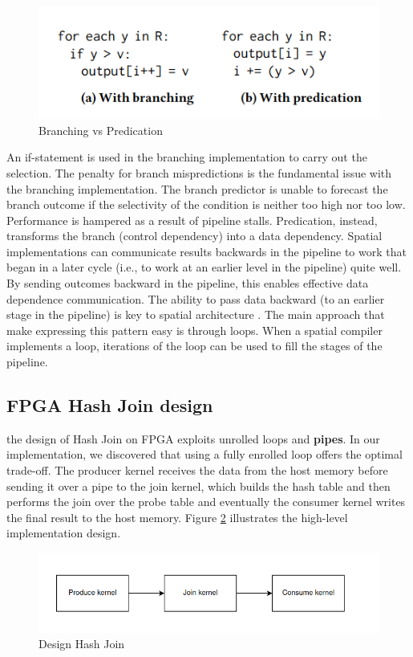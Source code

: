\documentclass[sigconf, nonacm]{acmart}
\begin{document}
\begin{figure}[H]
  \centering
  \includegraphics[width=\linewidth]{figures/select.png}
  \caption{Branching vs Predication}
  \label{fig:select}
\end{figure}
An if-statement is used in the branching implementation to carry out the selection.
The penalty for branch mispredictions is the fundamental issue with the branching implementation.
The branch predictor is unable to forecast the branch outcome if the selectivity of the condition is neither too high nor too low.
Performance is hampered as a result of pipeline stalls.
Predication, instead, transforms the branch (control dependency) into a data dependency.
Spatial implementations can communicate results backwards in the pipeline to work that began in a later cycle (i.e., to work at an earlier level in the pipeline) quite well.
By sending outcomes backward in the pipeline, this enables effective data dependence communication.
The ability to pass data backward (to an earlier stage in the pipeline)
is key to spatial architecture \cite{dpcpp_book}.
The main approach that make expressing this pattern easy is through loops.
When a spatial compiler implements a loop, iterations of the
loop can be used to fill the stages of the pipeline.
\subsection{FPGA Hash Join design}
the design of Hash Join on FPGA exploits unrolled loops and \textbf{pipes}.
In our implementation, we discovered that using a fully enrolled loop offers the optimal trade-off.
The producer kernel receives the data from the host memory before sending it over a pipe to the join kernel, which builds the hash table and then performs the join over the probe table and eventually the consumer kernel writes the final result to the host memory. 
Figure \ref{fig:desugnjoin} illustrates the high-level implementation design.
\begin{figure}[H]
  \centering
  \includegraphics[width=\linewidth]{figures/design-hashjoin-fpga.png}
  \caption{Design Hash Join}
  \label{fig:desugnjoin}
\end{figure}
\end{document}
